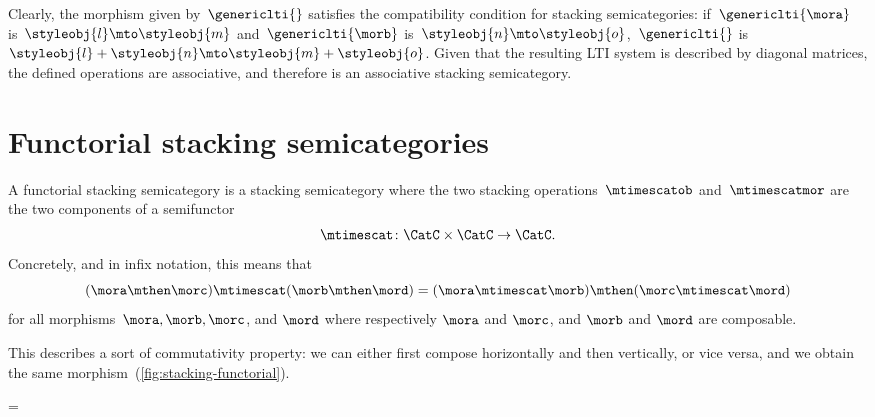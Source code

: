 Clearly, the morphism given by~$\genericlti{}$ satisfies the compatibility condition for stacking semicategories:
if~$\genericlti{\mora}$ is~$\styleobj{l}\mto \styleobj{m}$ and~$\genericlti{\morb}$ is~$\styleobj{n}\mto \styleobj{o}$,~$\genericlti{}$ is~$\styleobj{l}+\styleobj{n}\mto \styleobj{m}+\styleobj{o}$.
Given that the resulting LTI system is described by diagonal matrices, the defined operations are associative, and therefore \LTI is an associative stacking semicategory.

\section{Functorial stacking semicategories}

\begin{ctdefinition}
    \label{def:functorial-stacking-semi-cat}
    A functorial stacking semicategory is a stacking semicategory where the two stacking operations~$\mtimescatob$ and~$\mtimescatmor$ are the two components of a semifunctor
    \begin{equation}
        \mtimescat\colon \CatC \times \CatC \to \CatC.
    \end{equation}
    Concretely, and in infix notation, this means that
    \begin{equation}
        (\mora \mthen \morc )
        \mtimescat (\morb \mthen \mord )
        =
        (\mora \mtimescat \morb )
        \mthen (\morc \mtimescat \mord )
    \end{equation}
    for all morphisms~$\mora, \morb, \morc$, and $\mord$ where respectively $\mora$ and $\morc$, and $\morb$ and $\mord$ are composable.
\end{ctdefinition}

%
This describes a sort of commutativity property: we can either first compose horizontally and then vertically, or vice versa, and we obtain the same morphism~(\cref{fig:stacking-functorial}).

\begin{figure*}[h]
    \centering
    =
    \caption{Commutation of stacking and composition in a functorial stacking semicategory. }
    \label{fig:stacking-functorial}
\end{figure*}

